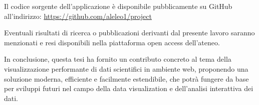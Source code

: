 Il codice sorgente dell’applicazione è disponibile pubblicamente su GitHub all’indirizzo: \url{https://github.com/aleleo1/project}

Eventuali risultati di ricerca o pubblicazioni derivanti dal presente lavoro saranno menzionati e resi disponibili nella piattaforma open access dell’ateneo.

In conclusione, questa tesi ha fornito un contributo concreto al tema della visualizzazione performante di dati scientifici in ambiente web, proponendo una soluzione moderna, efficiente e facilmente estendibile, che potrà fungere da base per sviluppi futuri nel campo della data visualization e dell’analisi interattiva dei dati.
